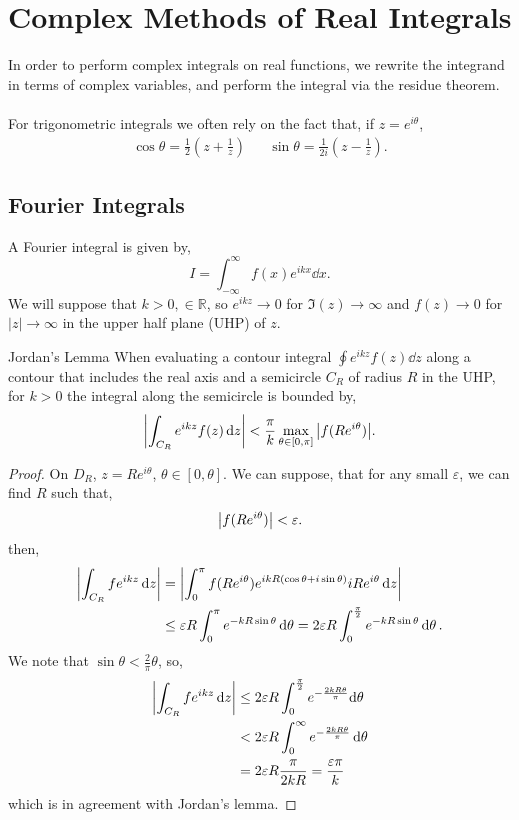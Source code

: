 \documentclass{book}
\begin{document}
\section{Complex Methods of Real Integrals}
In order to perform complex integrals on real functions, we rewrite the integrand in terms of complex variables, and perform the integral via the residue theorem.
\\\\
For trigonometric integrals we often rely on the fact that, if $z = e^{i\theta}$,
\begin{align}
	\cos\theta = \frac{1}{2}\left(z + \frac{1}{z}\right) && \sin\theta = \frac{1}{2i}\left(z - \frac{1}{z}\right).
\end{align} 
\subsection{Fourier Integrals}
A Fourier integral is given by,
\begin{equation}
	I = \int_{-\infty}^{\infty}f(x)e^{ikx}\dd{x}.
\end{equation}
We will suppose that $k > 0, \in \mathbb{R}$, so $e^{ikz} \to 0$ for $\Im(z) \to \infty$ and $f(z) \to 0$ for $|z| \to \infty$ in the upper half plane (UHP) of $z$.
\begin{Lemma}{Jordan's Lemma}
	When evaluating a contour integral $\oint e^{ikz}f(z) \dd{z}$ along a contour that includes the real axis and a semicircle $C_R$ of radius $R$ in the UHP, for $k >0$ the integral along the semicircle is bounded by,
	\begin{equation}
		\abs{\int_{C_R} e^{ikz}f(z)\dd{z}} < \frac{\pi}{k}\max_{\theta \in \left[0,\pi\right]}\abs{f(Re^{i\theta})}.
	\end{equation}
\end{Lemma}
\begin{proof}
	On $D_R$, $z=Re^{i\theta}$, $\theta \in \left[0,\theta\right]$. We can suppose, that for any small $\varepsilon$, we can find $R$ such that,
	\begin{equation}
		\abs{f(Re^{i\theta})} < \varepsilon.
	\end{equation}
	then,
	\begin{align}
		\abs{\int_{C_R}fe^{ikz}\dd{z}} & = \abs{\int_0^{\pi} f(Re^{i\theta})e^{ikR(\cos\theta + i \sin\theta)}iRe^{i\theta}\dd{z}} \\
		& \leq \varepsilon R\int_0^{\pi}e^{-kR\sin\theta}\dd{\theta} = 2\varepsilon R\int_0^{\frac{\pi}{2}}e^{-kR\sin\theta}\dd{\theta}.
	\end{align}
	We note that $\sin\theta < \frac{2}{\pi}\theta$, so,
	\begin{align}
			\abs{\int_{C_R}fe^{ikz}\dd{z}} & \leq 2\varepsilon R \int_0^{\frac{\pi}{2}}e^{-\frac{2kR\theta}{\pi}}\dd\theta \\
			&< 2\varepsilon R\int_0^{\infty}e^{-\frac{2kR\theta}{\pi}}\dd{\theta} \\
			&= 2\varepsilon R \frac{\pi}{2kR} = \frac{\varepsilon \pi}{k}
	\end{align}
	which is in agreement with Jordan's lemma. 
\end{proof}
\end{document}
